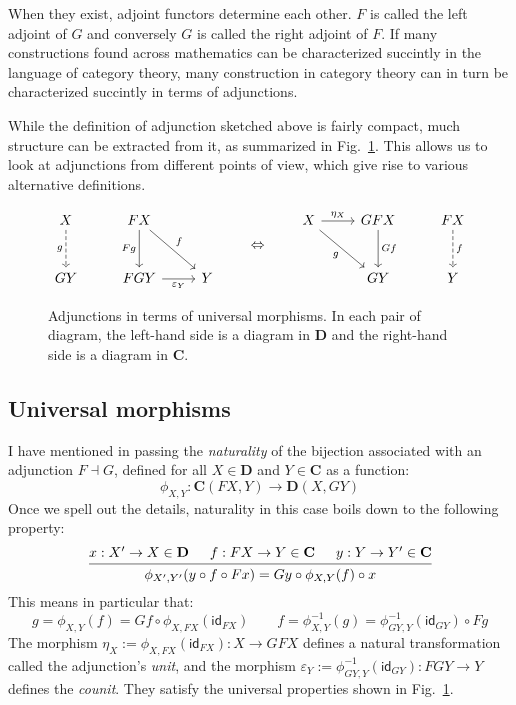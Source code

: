\documentclass[11pt,oneside,draft]{book}
\theoremstyle{definition}
\newcommand{\kw}[1]{\ensuremath{ \mathsf{#1} }}
\begin{document}
When they exist,
adjoint functors determine each other.
$F$ is called the left adjoint of $G$ and
conversely
$G$ is called the right adjoint of $F$.
If many constructions found across mathematics
can be characterized succintly in the language of category theory,
many construction in category theory
can in turn be characterized succintly in terms of adjunctions.

While the definition of adjunction sketched above
is fairly compact,
much structure can be extracted from it,
as summarized in Fig.~\ref{fig:adjunction}.
This allows us to look at adjunctions
from different points of view,
which give rise to various alternative definitions.


\begin{figure} %
  \[
    \begin{tikzcd}[row sep=large]
      X \ar[d, "g"', dashed] &
      FX \ar[d, "F g"'] \ar[dr, "f"] &
      \\
      G Y &
      F G Y \ar[r, "\varepsilon_Y"'] &
      Y
    \end{tikzcd}
    \qquad \Leftrightarrow \qquad
    \begin{tikzcd}[row sep=large]
      X \ar[r, "\eta_X"] \ar[dr, "g"'] &
      G F X \ar[d, "G f"] &
      F X \ar[d, "f", dashed]
      \\ &
      G Y & Y
    \end{tikzcd}
  \]
  \caption{Adjunctions in terms of universal morphisms.
    In each pair of diagram,
    the left-hand side is a diagram in $\mathbf{D}$ and
    the right-hand side is a diagram in $\mathbf{C}$.}
  \label{fig:adjunction}
\end{figure}

\subsection{Universal morphisms} %

I have mentioned in passing the \emph{naturality}
of the bijection associated with an adjunction $F \dashv G$,
defined for all $X \in \mathbf{D}$ and $Y \in \mathbf{C}$ as
a function:
\[
  \phi_{X, Y} : \mathbf{C}(F X, Y) \rightarrow \mathbf{D}(X, G Y)
\]
Once we spell out the details,
naturality in this case boils down to the following property:
\[
  \begin{prooftree}
    \hypo{x : X' \rightarrow X \in \mathbf{D}}
    \hypo{f : F X \rightarrow Y \in \mathbf{C}}
    \hypo{y : Y \rightarrow Y' \in \mathbf{C}}
    \infer3{\phi_{X',Y'}(y \circ f \circ F x) =
            G y \circ \phi_{X,Y}(f) \circ x}
  \end{prooftree}
\]
This means in particular that:
\[
  g = \phi_{X,Y}(f)
    = G f \circ \phi_{X,FX}(\kw{id}_{F X})
  \qquad
  f = \phi_{X,Y}^{-1}(g)
    = \phi_{GY,Y}^{-1}(\kw{id}_{G Y}) \circ F g
\]
The morphism
$\eta_X := \phi_{X,FX}(\kw{id}_{F X}) : X \rightarrow GFX$
defines a natural transformation
called the adjunction's \emph{unit},
and the morphism
$\varepsilon_Y := \phi_{GY,Y}^{-1}(\kw{id}_{G Y}) : FGY \rightarrow Y$
defines the \emph{counit}.
They satisfy the universal properties shown in
Fig.~\ref{fig:adjunction}.
\end{document}
